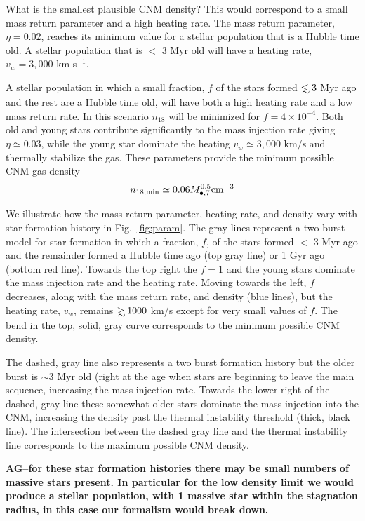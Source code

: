 \documentclass[usenatbib,fleqn]{mnras}
\newcommand\lsim{\mathrel{\rlap{\lower4pt\hbox{\hskip1pt$\sim$}}
    \raise1pt\hbox{$<$}}}
\newcommand\gsim{\mathrel{\rlap{\lower4pt\hbox{\hskip1pt$\sim$}}
    \raise1pt\hbox{$>$}}}
\newcommand{\Mbh}[1][]{M_{\bullet#1}}
\begin{document}
What is the smallest plausible CNM density? This would correspond to a
small mass return parameter and a high heating rate. The mass return
parameter, $\eta=0.02$, reaches its minimum value for a stellar
population that is a Hubble time old. A stellar population
that is $<$ 3 Myr old will have a heating rate, $v_w=3,000$ km s$^{-1}$.

A stellar population in which a small fraction, $f$ of the stars
formed $\lsim 3$ Myr ago and the rest are a Hubble time old, will have
both a high heating rate and a low mass return rate. In this scenario
$n_{18}$ will be minimized for $f=4\times 10^{-4}$. Both old and young
stars contribute significantly to the mass injection rate giving
$\eta\simeq 0.03$, while the young star dominate the heating
$v_w\simeq 3,000$ km/s and thermally stabilize the gas. These
parameters provide the minimum possible CNM gas density
\begin{equation}
n_{\rm 18,min}\simeq 0.06 \Mbh[,7]^{0.5} {\rm cm^{-3}}
\label{eq:n18min}
\end{equation}

We illustrate how the mass return parameter, heating rate, and
density vary with star formation history in Fig.~\ref{fig:param}. The
gray lines represent a two-burst model for star formation in which a
fraction, $f$, of the stars formed $<$ 3 Myr ago and the remainder
formed a Hubble time ago (top gray line) or 1 Gyr ago (bottom red
line).  Towards the top right the $f=1$ and the young stars dominate
the mass injection rate and the heating rate.  Moving towards the
left, $f$ decreases, along with the mass return rate, and density
(blue lines), but the heating rate, $v_w$, remains $\gsim 1000$ km/s
except for very small values of $f$. The bend in the top, solid, gray curve
corresponds to the minimum possible CNM density.

The dashed, gray line also represents a two burst formation history
but the older burst is $\sim 3$ Myr old (right at the age when stars
are beginning to leave the main sequence, increasing the mass
injection rate. Towards the lower right of the dashed, gray line these
somewhat older stars dominate the mass injection into the CNM,
increasing the density past the thermal instability threshold (thick,
black line). The intersection between the dashed gray line and the
thermal instability line corresponds to the maximum possible CNM
density.

{\bf AG--for these star formation histories there may be small numbers
of massive stars present. In particular for the low density limit we
would produce a stellar population, with 1 massive star within the
stagnation radius, in this case our formalism would break down.}
\end{document}
